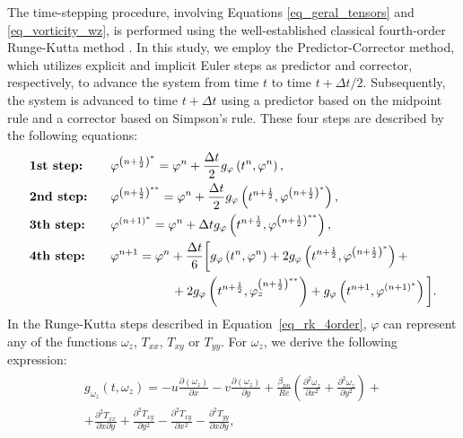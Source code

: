 \documentclass[preprint, 12pt]{elsarticle}
\begin{document}
The time-stepping procedure, involving Equations \eqref{eq_geral_tensors} and \eqref{eq_vorticity_wz}, is performed using the well-established classical fourth-order Runge-Kutta method \cite{ferziger2002computational}. In this study, we employ the Predictor-Corrector method, which utilizes explicit and implicit Euler steps as predictor and corrector, respectively, to advance the system from time $t$ to time $t+\Delta t / 2$. Subsequently, the system is advanced to time $t+\Delta t$ using a predictor based on the midpoint rule and a corrector based on Simpson's rule. These four steps are described by the following equations:
\begin{gather}
    \begin{aligned}
        &\textbf{1st step:} & & \hspace{0.3cm}\varphi^{\left(n+\frac{1}{2}\right)^{*}} =\varphi^n+\frac{\Delta t}{2} g_{\varphi}\left(t^n, \varphi^n\right),\\
        &\textbf{2nd step:} & & \hspace{0.3cm}\varphi^{\left(n+\frac{1}{2}\right)^{* *}} =\varphi^n+\frac{\Delta t}{2} g_{\varphi}\left(t^{n+\frac{1}{2}}, \varphi^{\left(n+\frac{1}{2}\right)^*}\right),\\
        &\textbf{3th step:} & & \hspace{0.3cm}\varphi^{(n+1)^*} =\varphi^n+\Delta t g_{\varphi}\left(t^{n+\frac{1}{2}},\varphi^{\left(n+\frac{1}{2}\right)^{* *}}\right),\\
        &\textbf{4th step:} & & \hspace{0.3cm}\varphi^{n+1} = \varphi^n+\frac{\Delta t}{6}\bigg[g_{\varphi}\left(t^n, \varphi^n\right) + 2 g_{\varphi}\left(t^{n+\frac{1}{2}}, \varphi^{\left(n+\frac{1}{2}\right)^{*}}\right) + \\ 
        & & &\hspace{2cm} + 2 g_{\varphi}\left(t^{n+\frac{1}{2}}, \varphi_{z}^{\left(n+\frac{1}{2}\right)^{**}}\right)+ g_{\varphi}\left(t^{n+1}, \varphi^{(n+1)^{*}}\right)\bigg].\label{eq_rk_4order}
    \end{aligned}
\end{gather}
In the Runge-Kutta steps described in Equation~\eqref{eq_rk_4order}, $\varphi$ can represent any of the functions $\omega_{z}$, $T_{xx}$, $T_{xy}$ or $T_{yy}$. For $\omega_{z}$, we derive the following expression:
\begin{gather}
    \begin{aligned}
        g_{\omega_{z}}\left(t, \omega_z\right) = - u\frac{\partial\left(\omega_{z}\right)}{\partial x} - v \frac{\partial\left(\omega_{z}\right)}{\partial y} + \frac{\beta_{nn}}{R e}\left(\frac{\partial^2 \omega_{z}}{\partial x^2} + \frac{\partial^2 \omega_{z}}{\partial y^2}\right) + \\ +  \frac{\partial^2 T_{x x}}{\partial x \partial y} + \frac{\partial^2 T_{x y}}{\partial y^2} - \frac{\partial^2 T_{x y}}{\partial x^2} - \frac{\partial^2 T_{y y}}{\partial x \partial y},
    \end{aligned}
\end{gather}
\end{document}
